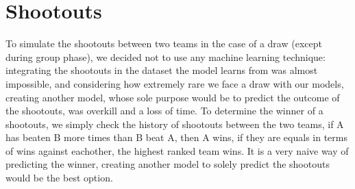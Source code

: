 \newpage
\section{Shootouts}
To simulate the shootouts between two teams in the case of a draw (except during group phase), we decided not to use any machine learning technique: integrating the shootouts in the dataset the model learns from was almost impossible, and considering how extremely rare we face a draw with our models, creating another model, whose sole purpose would be to predict the outcome of the shootouts, was overkill and a loss of time.
To determine the winner of a shootouts, we simply check the history of shootouts between the two teams, if A has beaten B more times than B beat A, then A wins, if they are equals in terms of wins against eachother, the highest ranked team wins.
It is a very naive way of predicting the winner, creating another model to solely predict the shootouts would be the best option.

